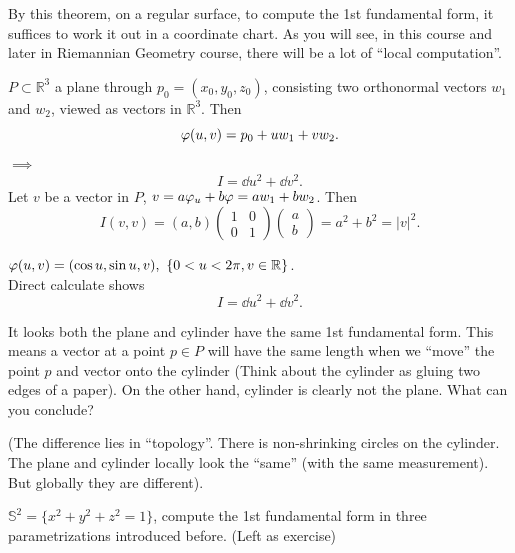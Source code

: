 \begin{remark}
    By this theorem, on a regular surface, to compute the 1st fundamental form,
    it suffices to work it out in a coordinate chart. As you will see, in this
    course and later in Riemannian Geometry course, there will be a lot of ``local
    computation''.
\end{remark}

\begin{example}[Plane]
    \(P\subset \mathbb{R}^3\) a plane through \(p_0=(x_0,y_0,z_0)\), consisting two
    orthonormal vectors \(w_1\) and \(w_2\), viewed as vectors in \(\mathbb{R}^3\).
    Then \[
        \varphi(u,v)=p_0+uw_1+vw_2
    .\] \(\implies \) \[
        I=\dd{u}^2+\dd{v}^2
    .\] Let \(v\) be a vector in \(P\), \(v=a\varphi_u+b\varphi=aw_1+bw_2\). Then \[
        I(v,v)=(a,b)\begin{pmatrix}
            1 & 0 \\
            0 & 1
        \end{pmatrix}\begin{pmatrix}
            a \\ b
        \end{pmatrix}=a^2+b^2=|v|^2
    .\] 
\end{example}

\begin{example}[Cylinder]
    \(\vphi(u,v)=(\cos u, \sin u, v),\ \{0<u<2\pi,v\in \mathbb{R}\}\). \\
    Direct calculate shows \[
        I=\dd{u}^2+\dd{v}^2
    .\] 
\end{example}
\begin{question}
    It looks both the plane and cylinder have the same 1st fundamental form. This
    means a vector at a point \(p\in P\) will have the same length when we ``move''
    the point \(p\) and vector onto the cylinder (Think about the cylinder as gluing
    two edges of a paper). On the other hand, cylinder is clearly not the plane.
    What can you conclude?

    (The difference lies in ``topology''. There is non-shrinking circles on the
    cylinder. The plane and cylinder locally look the ``same'' (with the same
    measurement). But globally they are different).
\end{question}

\begin{example}
    \(\mathbb{S}^2=\{x^2+y^2+z^2=1\}\), compute the 1st fundamental form in
    three parametrizations introduced before. (Left as exercise)
\end{example}
